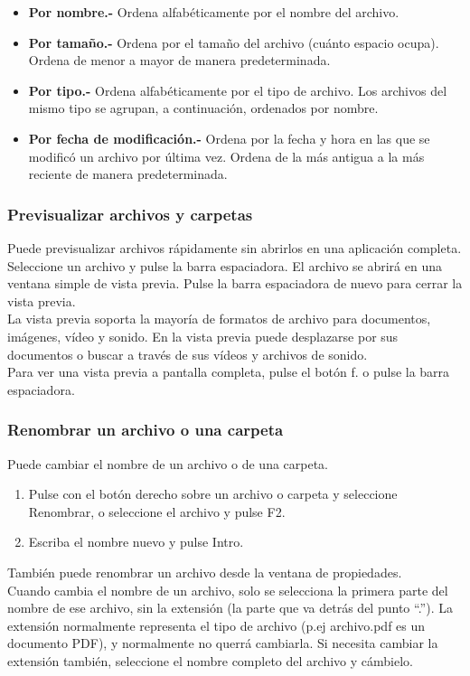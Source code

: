 \begin{itemize}
\begin{itemize}
\item {\bf Por nombre.-} Ordena alfabéticamente por el nombre del archivo.
\item {\bf Por tamaño.-} Ordena por el tamaño del archivo (cuánto espacio ocupa). Ordena de menor a mayor de manera predeterminada.
\item {\bf Por tipo.-} Ordena alfabéticamente por el tipo de archivo. Los archivos del mismo tipo se agrupan, a continuación, ordenados por nombre.
\item {\bf Por fecha de modificación.-} Ordena por la fecha y hora en las que se modificó un archivo por última vez. Ordena de la más antigua a la más reciente de manera predeterminada.
\end{itemize}
\end{itemize}
\subsubsection{Previsualizar archivos y carpetas}
Puede previsualizar archivos rápidamente sin abrirlos en una aplicación completa. Seleccione un archivo y pulse la barra espaciadora. El archivo se abrirá en una ventana simple de vista previa. Pulse la barra espaciadora de nuevo para cerrar la vista previa.\\
La vista previa soporta la mayoría de formatos de archivo para documentos, imágenes, vídeo y sonido. En la vista previa puede desplazarse por sus documentos o buscar a través de sus vídeos y archivos de sonido.\\
Para ver una vista previa a pantalla completa, pulse el botón f. o pulse la barra espaciadora.
\subsubsection{Renombrar un archivo o una carpeta}
Puede cambiar el nombre de un archivo o de una carpeta.
\begin{enumerate}
\item Pulse con el botón derecho sobre un archivo o carpeta y seleccione Renombrar, o seleccione el archivo y pulse F2.
\item Escriba el nombre nuevo y pulse Intro.
\end{enumerate}
También puede renombrar un archivo desde la ventana de propiedades.\\
Cuando cambia el nombre de un archivo, solo se selecciona la primera parte del nombre de ese archivo, sin la extensión (la parte que va detrás del punto “.”). La extensión normalmente representa el tipo de archivo (p.ej archivo.pdf es un documento PDF), y normalmente no querrá cambiarla. Si necesita cambiar la extensión también, seleccione el nombre completo del archivo y cámbielo.\\

